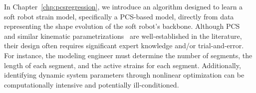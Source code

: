 In Chapter~\ref{chp:pcsregression}, we introduce an algorithm designed to learn a soft robot strain model, specifically a \gls{PCS}-based model, directly from data representing the shape evolution of the soft robot’s backbone.
Although \gls{PCS}~\cite{renda2018discrete} and similar kinematic parametrizations~\cite{alessi2024rod} are well-established in the literature, their design often requires significant expert knowledge and/or trial-and-error. For instance, the modeling engineer must determine the number of segments, the length of each segment, and the active strains for each segment.
Additionally, identifying dynamic system parameters through nonlinear optimization can be computationally intensive and potentially ill-conditioned.
